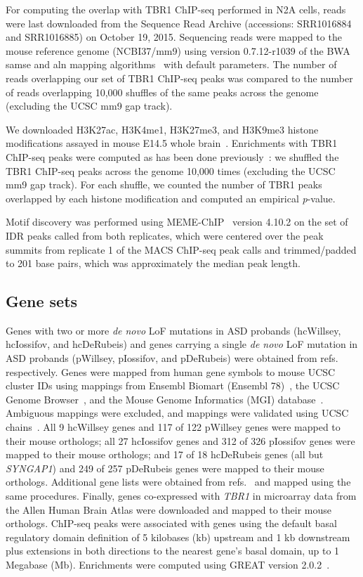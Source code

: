 For computing the overlap with TBR1 ChIP-seq performed in N2A cells,
reads were last downloaded from the Sequence Read Archive (accessions:
SRR1016884 and SRR1016885) on October 19, 2015. Sequencing reads were
mapped to the mouse reference genome (NCBI37/mm9) using version
0.7.12-r1039 of the BWA samse and aln mapping algorithms~\citep{Li:2009fi} with default parameters. The number of reads overlapping our set
of TBR1 ChIP-seq peaks was compared to the number of reads overlapping
10,000 shuffles of the same peaks across the genome (excluding the UCSC
mm9 gap track).

We downloaded H3K27ac, H3K4me1, H3K27me3, and H3K9me3 histone
modifications assayed in mouse E14.5 whole brain~\citep{ENCODEProjectConsortium:2012gc}. Enrichments with TBR1 ChIP-seq peaks were computed as
has been done previously~\citep{Notwell:2015hj}: we shuffled the TBR1
ChIP-seq peaks across the genome 10,000 times (excluding the UCSC mm9
gap track). For each shuffle, we counted the number of TBR1 peaks
overlapped by each histone modification and computed an empirical
\emph{p}-value.

Motif discovery was performed using MEME-ChIP~\citep{Machanick:2011ge} version 4.10.2 on the set of IDR peaks called from both
replicates, which were centered over the peak summits from replicate 1
of the MACS ChIP-seq peak calls and trimmed/padded to 201 base pairs,
which was approximately the median peak length.

\subsection{Gene sets}

Genes with two or more \emph{de novo} LoF mutations in ASD probands
(hcWillsey, hcIossifov, and hcDeRubeis) and genes carrying a single
\emph{de novo} LoF mutation in ASD probands (pWillsey, pIossifov, and
pDeRubeis) were obtained from refs.~\citep{Willsey:2013bd, Iossifov:2014if, DeRubeis:2014cw} respectively. Genes were mapped from human
gene symbols to mouse UCSC cluster IDs using mappings from Ensembl
Biomart (Ensembl 78)~\citep{Cunningham:2015ew}, the UCSC Genome Browser~\citep{Rosenbloom:2015bg}, and the Mouse Genome Informatics (MGI)
database~\citep{Eppig:2015ib}. Ambiguous mappings were excluded, and
mappings were validated using UCSC chains~\citep{Rosenbloom:2015bg}. All
9 hcWillsey genes and 117 of 122 pWillsey genes were mapped to their
mouse orthologs; all 27 hcIossifov genes and 312 of 326 pIossifov genes
were mapped to their mouse orthologs; and 17 of 18 hcDeRubeis genes (all
but \emph{SYNGAP1}) and 249 of 257 pDeRubeis genes were mapped to their
mouse orthologs. Additional gene lists were obtained from refs.~\citep{Parikshak:2013di, Li:2014ft, Hormozdiari:2015ih} and
mapped using the same procedures. Finally, genes co-expressed with
\emph{TBR1} in microarray data from the Allen Human Brain Atlas were
downloaded and mapped to their mouse orthologs. ChIP-seq peaks were
associated with genes using the default basal regulatory domain
definition of 5 kilobases (kb) upstream and 1 kb downstream plus
extensions in both directions to the nearest gene's basal domain, up to
1 Megabase (Mb). Enrichments were computed using GREAT version 2.0.2~\citep{McLean:2010iq}.

